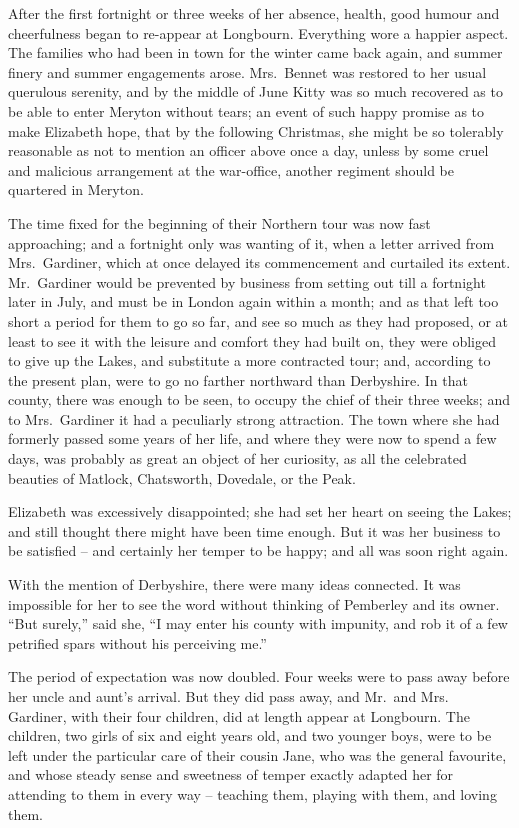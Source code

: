 After the first fortnight or three weeks of her absence,
health, good humour and cheerfulness began to re-appear
at Longbourn. Everything wore a happier aspect. The
families who had been in town for the winter came back
again, and summer finery and summer engagements arose.
Mrs.\ Bennet was restored to her usual querulous serenity,
and by the middle of June Kitty was so much recovered
as to be able to enter Meryton without tears; an event
of such happy promise as to make Elizabeth hope, that
by the following Christmas, she might be so tolerably
reasonable as not to mention an officer above once a day,
unless by some cruel and malicious arrangement at the
war-office, another regiment should be quartered in
Meryton.

The time fixed for the beginning of their Northern tour
was now fast approaching; and a fortnight only was
wanting of it, when a letter arrived from Mrs.\ Gardiner,
which at once delayed its commencement and curtailed
its extent. Mr.\ Gardiner would be prevented by business
from setting out till a fortnight later in July, and must
be in London again within a month; and as that left
too short a period for them to go so far, and see so much
as they had proposed, or at least to see it with the leisure
and comfort they had built on, they were obliged to give
up the Lakes, and substitute a more contracted tour; and,
according to the present plan, were to go no farther
northward than Derbyshire. In that county, there was
enough to be seen, to occupy the chief of their three weeks;
and to Mrs.\ Gardiner it had a peculiarly strong attraction.
The town where she had formerly passed some years of
her life, and where they were now to spend a few days,
was probably as great an object of her curiosity, as all
the celebrated beauties of Matlock, Chatsworth, Dovedale,
or the Peak.

Elizabeth was excessively disappointed; she had set
her heart on seeing the Lakes; and still thought there
might have been time enough. But it was her business
to be satisfied -- and certainly her temper to be happy;
and all was soon right again.

With the mention of Derbyshire, there were many ideas
connected. It was impossible for her to see the word
without thinking of Pemberley and its owner. “But
surely,” said she, “I may enter his county with impunity,
and rob it of a few petrified spars without his perceiving
me.”

The period of expectation was now doubled. Four
weeks were to pass away before her uncle and aunt’s
arrival. But they did pass away, and Mr.\ and Mrs.\ %
Gardiner, with their four children, did at length appear
at Longbourn. The children, two girls of six and eight
years old, and two younger boys, were to be left under
the particular care of their cousin Jane, who was the
general favourite, and whose steady sense and sweetness
of temper exactly adapted her for attending to them in
every way -- teaching them, playing with them, and loving
them.

